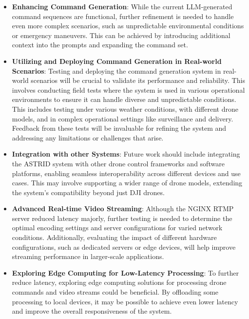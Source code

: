 \begin{itemize}
    \item \textbf{Enhancing Command Generation}:
    While the current \ac{LLM}-generated command sequences are functional, further refinement is needed to handle even more complex scenarios, such as unpredictable environmental conditions or emergency maneuvers. 
    This can be achieved by introducing additional context into the prompts and expanding the command set.

    \item \textbf{Utilizing and Deploying Command Generation in Real-world Scenarios}:
        Testing and deploying the command generation system in real-world scenarios will be crucial to validate its performance and reliability. 
        This involves conducting field tests where the system is used in various operational environments to ensure it can handle diverse and unpredictable conditions. 
        This includes testing under various weather conditions, with different drone models, and in complex operational settings like surveillance and delivery. 
        Feedback from these tests will be invaluable for refining the system and addressing any limitations or challenges that arise.
    
    \item \textbf{Integration with other Systems}:
    Future work should include integrating the \ac{ASTRID} system with other drone control frameworks and software platforms, enabling seamless interoperability across different devices and use cases. 
    This may involve supporting a wider range of drone models, extending the system's compatibility beyond just DJI drones.
    
    \item \textbf{Advanced Real-time Video Streaming}:
    Although the NGINX \ac{RTMP} server reduced latency majorly, further testing is needed to determine the optimal encoding settings and server configurations for varied network conditions. 
    Additionally, evaluating the impact of different hardware configurations, such as dedicated servers or edge devices, will help improve streaming performance in larger-scale applications.
    
    \item \textbf{Exploring Edge Computing for Low-Latency Processing}:
    To further reduce latency, exploring edge computing solutions for processing drone commands and video streams could be beneficial. 
    By offloading some processing to local devices, it may be possible to achieve even lower latency and improve the overall responsiveness of the system.


\end{itemize}
